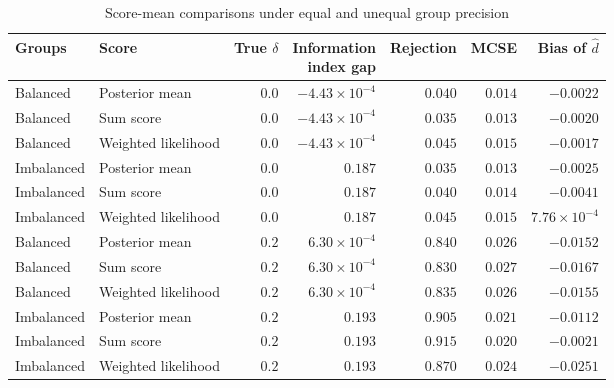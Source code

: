 \begin{table}[htbp]\centering
\caption{Score-mean comparisons under equal and unequal group precision}\label{tab:s5b-scores}
{\footnotesize\setlength{\tabcolsep}{4.5pt}\begin{tabular}{llrrrrr}
\toprule
Groups & Score & True $\delta$ & \shortstack{Information\\index gap} & Rejection & MCSE & Bias of $\hat d$ \\
\midrule
Balanced & Posterior mean & $0.0$ & $-4.43\times 10^{-4}$ & $0.040$ & $0.014$ & $-0.0022$ \\
Balanced & Sum score & $0.0$ & $-4.43\times 10^{-4}$ & $0.035$ & $0.013$ & $-0.0020$ \\
Balanced & Weighted likelihood & $0.0$ & $-4.43\times 10^{-4}$ & $0.045$ & $0.015$ & $-0.0017$ \\
Imbalanced & Posterior mean & $0.0$ & $0.187$ & $0.035$ & $0.013$ & $-0.0025$ \\
Imbalanced & Sum score & $0.0$ & $0.187$ & $0.040$ & $0.014$ & $-0.0041$ \\
Imbalanced & Weighted likelihood & $0.0$ & $0.187$ & $0.045$ & $0.015$ & $7.76\times 10^{-4}$ \\
Balanced & Posterior mean & $0.2$ & $6.30\times 10^{-4}$ & $0.840$ & $0.026$ & $-0.0152$ \\
Balanced & Sum score & $0.2$ & $6.30\times 10^{-4}$ & $0.830$ & $0.027$ & $-0.0167$ \\
Balanced & Weighted likelihood & $0.2$ & $6.30\times 10^{-4}$ & $0.835$ & $0.026$ & $-0.0155$ \\
Imbalanced & Posterior mean & $0.2$ & $0.193$ & $0.905$ & $0.021$ & $-0.0112$ \\
Imbalanced & Sum score & $0.2$ & $0.193$ & $0.915$ & $0.020$ & $-0.0021$ \\
Imbalanced & Weighted likelihood & $0.2$ & $0.193$ & $0.870$ & $0.024$ & $-0.0251$ \\
\bottomrule
\end{tabular}}
\end{table}
